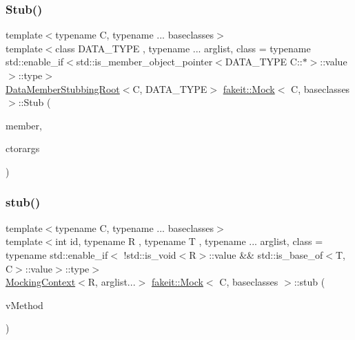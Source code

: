 \subsubsection{\texorpdfstring{Stub()}{Stub()}\hspace{0.1cm}{\footnotesize\ttfamily [1/9]}}
{\footnotesize\ttfamily template$<$typename C, typename ... baseclasses$>$ \\
template$<$class D\+A\+T\+A\+\_\+\+T\+Y\+PE , typename ... arglist, class  = typename std\+::enable\+\_\+if$<$std\+::is\+\_\+member\+\_\+object\+\_\+pointer$<$\+D\+A\+T\+A\+\_\+\+T\+Y\+P\+E C\+::$\ast$$>$\+::value$>$\+::type$>$ \\
\mbox{\hyperlink{classfakeit_1_1DataMemberStubbingRoot}{Data\+Member\+Stubbing\+Root}}$<$C, D\+A\+T\+A\+\_\+\+T\+Y\+PE$>$ \mbox{\hyperlink{classfakeit_1_1Mock}{fakeit\+::\+Mock}}$<$ C, baseclasses $>$\+::Stub (\begin{DoxyParamCaption}\item[{D\+A\+T\+A\+\_\+\+T\+Y\+PE C\+::$\ast$}]{member,  }\item[{const arglist \&...}]{ctorargs }\end{DoxyParamCaption})\hspace{0.3cm}{\ttfamily [inline]}}

\mbox{\label{classfakeit_1_1Mock_a7a8f38b58b068b35f263eee42d75c162}} 
\subsubsection{\texorpdfstring{stub()}{stub()}\hspace{0.1cm}{\footnotesize\ttfamily [1/72]}}
{\footnotesize\ttfamily template$<$typename C, typename ... baseclasses$>$ \\
template$<$int id, typename R , typename T , typename ... arglist, class  = typename std\+::enable\+\_\+if$<$                !std\+::is\+\_\+void$<$\+R$>$\+::value \&\& std\+::is\+\_\+base\+\_\+of$<$\+T, C$>$\+::value$>$\+::type$>$ \\
\mbox{\hyperlink{classfakeit_1_1MockingContext}{Mocking\+Context}}$<$R, arglist...$>$ \mbox{\hyperlink{classfakeit_1_1Mock}{fakeit\+::\+Mock}}$<$ C, baseclasses $>$\+::stub (\begin{DoxyParamCaption}\item[{R(T\+::$\ast$)(arglist...) const}]{v\+Method }\end{DoxyParamCaption})\hspace{0.3cm}{\ttfamily [inline]}}

